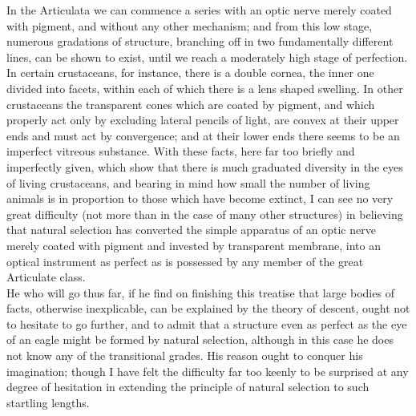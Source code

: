 \indent In the Articulata we can commence a series with an optic nerve merely coated with pigment, and without any other mechanism; and from this low stage, numerous gradations of structure, branching off in two fundamentally different lines, can be shown to exist, until we reach a moderately high stage of perfection. In certain crustaceans, for instance, there is a double cornea, the inner one divided into facets, within each of which there is a lens shaped swelling. In other crustaceans the transparent cones which are coated by pigment, and which properly act only by excluding lateral pencils of light, are convex at their upper ends and must act by convergence; and at their lower ends there seems to be an imperfect vitreous substance. With these facts, here far too briefly and imperfectly given, which show that there is much graduated diversity in the eyes of living crustaceans, and bearing in mind how small the number of living animals is in proportion to those which have become extinct, I can see no very great difficulty (not more than in the case of many other structures) in believing that natural selection has converted the simple apparatus of an optic nerve merely coated with pigment and invested by transparent membrane, into an optical instrument as perfect as is possessed by any member of the great Articulate class.\\
\indent He who will go thus far, if he find on finishing this treatise that large bodies of facts, otherwise inexplicable, can be explained by the theory of descent, ought not to hesitate to go further, and to admit that a structure even as perfect as the eye of an eagle might be formed by natural selection, although in this case he does not know any of the transitional grades. His reason ought to conquer his imagination; though I have felt the difficulty far too keenly to be surprised at any degree of hesitation in extending the principle of natural selection to such startling lengths.\\
